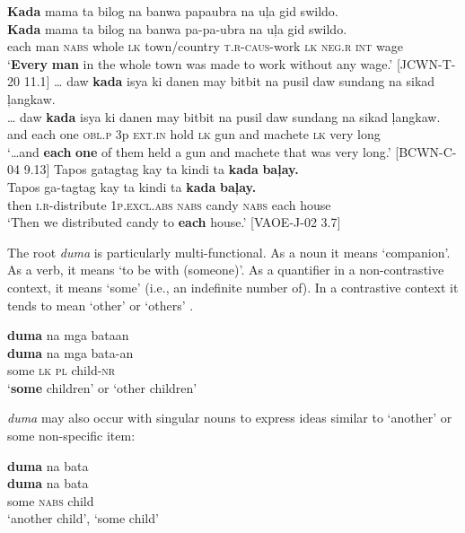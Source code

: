 \ea
\label{bkm:Ref425584633}
\textbf{Kada}  mama  ta  bilog  na  banwa  papaubra na  uļa  gid  swildo. \\\smallskip
 \gll \textbf{Kada}  mama  ta  bilog  na  banwa  pa-pa-ubra na  uļa  gid  swildo. \\
each  man  \textsc{nabs}  whole  \textsc{lk}  town/country  \textsc{t.r}-\textsc{caus}-work
\textsc{lk}  \textsc{neg.r}  \textsc{int}  wage \\
\glt `\textbf{Every} \textbf{man} in the whole town was made to work without any wage.’ [JCWN-T-20 11.1]
\z
\ea
\label{bkm:Ref425234047}
… daw  \textbf{kada}  isya  ki  danen  may  bitbit  na  pusil  daw  sundang na  sikad  ļangkaw. \\\smallskip
 \gll … daw  \textbf{kada}  isya  ki  danen  may  bitbit  na  pusil  daw  sundang na  sikad  ļangkaw. \\
{} and  each  one  \textsc{obl.p}  3p  \textsc{ext.in}  hold  \textsc{lk}  gun  and  machete
\textsc{lk}  very  long \\
\glt `…and \textbf{each} \textbf{one} of them  held a gun and machete that was very long.’ [BCWN-C-04 9.13]
\z
\ea
\label{bkm:Ref424540252}
Tapos  gatagtag  kay  ta  kindi  ta  \textbf{kada}  \textbf{baļay.} \\\smallskip
 \gll Tapos  ga-tagtag  kay  ta  kindi  ta  \textbf{kada}  \textbf{baļay.} \\
then  \textsc{i.r}-distribute  1\textsc{p.excl.abs}  \textsc{nabs}  candy  \textsc{nabs}  each  house \\
\glt ‘Then we distributed candy to \textbf{each} house.’ [VAOE-J-02 3.7]
\z

The root \textit{duma} is particularly multi-functional. As a noun it means ‘companion’. As a verb, it means ‘to be with (someone)’. As a quantifier in a non-contras\-tive context, it means ‘some’ (i.e., an indefinite number of). In a contrastive context it tends to mean ‘other’ or ‘others’ .

\ea
\label{bkm:Ref329087006}
\textbf{duma}  na  mga  bataan \\\smallskip
 \gll \textbf{duma}  na  mga  bata-an \\
some  \textsc{lk}  \textsc{pl}  child-\textsc{nr} \\
\glt ‘\textbf{some} children’ or ‘other children’
\z

\textit{duma} may also occur with singular nouns to express ideas similar to ‘another’ or some non-specific item:

\ea
\textbf{duma} na bata \\\smallskip
 \gll \textbf{duma} na bata \\
some \textsc{nabs} child \\
\glt ‘another child’, ‘some child’
\z

